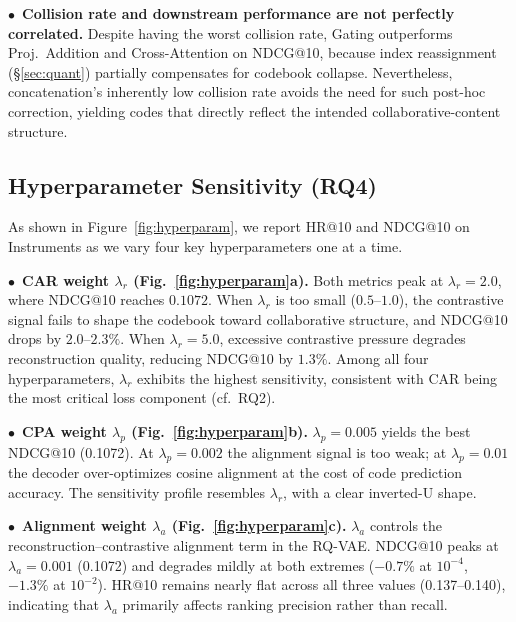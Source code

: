 \documentclass[sigconf, anonymous, review]{acmart}
\begin{document}
\noindent$\bullet$~\textbf{Collision rate and downstream performance are not perfectly correlated.}
%
Despite having the worst collision rate, Gating outperforms Proj.\ Addition and Cross-Attention on NDCG@10, because index reassignment (\S\ref{sec:quant}) partially compensates for codebook collapse.
%
Nevertheless, concatenation's inherently low collision rate avoids the need for such post-hoc correction, yielding codes that directly reflect the intended collaborative-content structure.

\subsection{Hyperparameter Sensitivity (RQ4)}
\label{sec:rq4}

As shown in Figure~\ref{fig:hyperparam}, we report HR@10 and NDCG@10 on Instruments as we vary four key hyperparameters one at a time.

\noindent$\bullet$~\textbf{CAR weight $\lambda_r$ (Fig.~\ref{fig:hyperparam}a).}
%
Both metrics peak at $\lambda_r\!=\!2.0$, where NDCG@10 reaches $0.1072$.
%
When $\lambda_r$ is too small ($0.5$--$1.0$), the contrastive signal fails to shape the codebook toward collaborative structure, and NDCG@10 drops by $2.0$--$2.3\%$.
%
When $\lambda_r\!=\!5.0$, excessive contrastive pressure degrades reconstruction quality, reducing NDCG@10 by $1.3\%$.
%
Among all four hyperparameters, $\lambda_r$ exhibits the highest sensitivity, consistent with CAR being the most critical loss component (cf.\ RQ2).

\noindent$\bullet$~\textbf{CPA weight $\lambda_p$ (Fig.~\ref{fig:hyperparam}b).}
%
$\lambda_p\!=\!0.005$ yields the best NDCG@10 (0.1072).
%
At $\lambda_p\!=\!0.002$ the alignment signal is too weak; at $\lambda_p\!=\!0.01$ the decoder over-optimizes cosine alignment at the cost of code prediction accuracy.
%
The sensitivity profile resembles $\lambda_r$, with a clear inverted-U shape.

\noindent$\bullet$~\textbf{Alignment weight $\lambda_a$ (Fig.~\ref{fig:hyperparam}c).}
%
$\lambda_a$ controls the reconstruction--contrastive alignment term in the RQ-VAE.
%
NDCG@10 peaks at $\lambda_a\!=\!0.001$ (0.1072) and degrades mildly at both extremes ($-0.7\%$ at $10^{-4}$, $-1.3\%$ at $10^{-2}$).
%
HR@10 remains nearly flat across all three values (0.137--0.140), indicating that $\lambda_a$ primarily affects ranking precision rather than recall.
\end{document}
